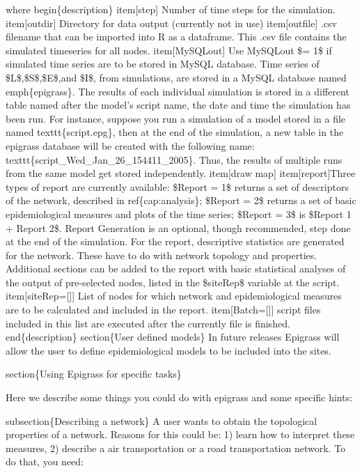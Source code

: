 \documentclass[a4paper,10pt]{manual}
\begin{document}
where
begin\{description\}
item{[}step{]} Number of time steps for the simulation.
item{[}outdir{]} Directory for data output (currently not in use)
item{[}outfile{]} .csv filename that can be imported into R as a dataframe. This .csv file contains the simulated timeseries for all nodes.
item{[}MySQLout{]} Use MySQLout \$= 1\$ if simulated time series are to be stored in MySQL database. Time series of \$L\$,\$S\$,\$E\$,and \$I\$, from simulations, are stored in a MySQL database named emph\{epigrass\}. The results of each individual simulation is stored in a different table named after the model's script name, the date and time the simulation has been run. For instance, suppose you run a simulation of a model stored in a file named texttt\{script.epg\}, then at the end of the simulation, a new table in the epigrass database will be created with the following name: texttt\{script\_Wed\_Jan\_26\_154411\_2005\}. Thus, the results of multiple runs from the same model get stored independently.
item{[}draw map{]}
item{[}report{]}Three types of report are currently available: \$Report = 1\$ returns a set of descriptors of the network, described in ref\{cap:analysis\}; \$Report = 2\$ returns a set of basic epidemiological measures and plots of the time series; \$Report = 3\$ is \$Report 1 + Report 2\$. Report Generation is an optional, though recommended, step done at the end of the simulation. For the report, descriptive statistics are generated for the network. These have to do with network topology and properties. Additional sections can be added to the report with basic statistical analyses of the output of pre-selected nodes, listed  in the \$siteRep\$ variable at the script.
item{[}siteRep={[}{]}{]} List of nodes for which network and epidemiological measures are to be calculated and included in the report.
item{[}Batch={[}{]}{]} script files included in this list are executed after the currently file is finished.
end\{description\}
section\{User defined models\}
In future releases Epigrass will allow the user to define epidemiological models to be included into the sites.

section\{Using Epigrass for specific tasks\}

Here we describe some things you could do with epigrass and some specific hints:

subsection\{Describing a network\}
A user wants to obtain the topological properties of a network. Reasons for this could be: 1) learn how to interpret these measures, 2) describe a air transportation or a road transportation network. To do that, you need:
\end{document}

